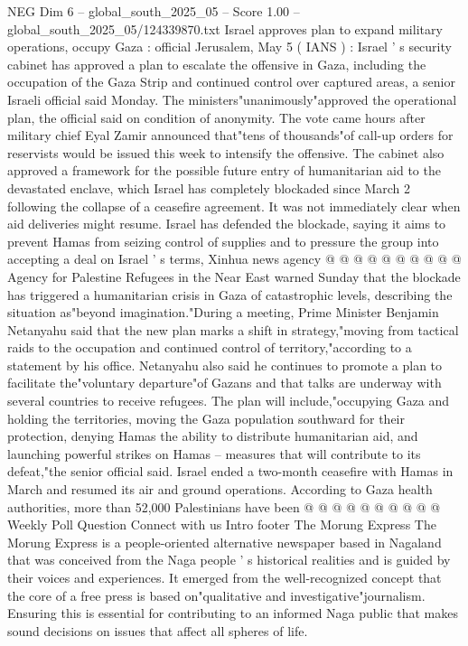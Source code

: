 \begin{textsample}{NEG Dim 6 – global\_south\_2025\_05 – Score 1.00 – global\_south\_2025\_05/124339870.txt}  \label{ex:f6_neg_423}
Israel approves plan to expand military operations, occupy Gaza : official Jerusalem, May 5 ( IANS ) : Israel ' s security cabinet has approved a plan to escalate the offensive in Gaza, including the occupation of the Gaza Strip and continued control over captured areas, a senior Israeli official said Monday.
The ministers"unanimously"approved the operational plan, the official said on condition of anonymity.
The vote came hours after military chief Eyal Zamir announced that"tens of thousands"of call-up orders for reservists would be issued this week to intensify the offensive.
The cabinet also approved a framework for the possible future entry of humanitarian aid to the devastated enclave, which Israel has completely blockaded since March 2 following the collapse of a ceasefire agreement.
It was not immediately clear when aid deliveries might resume.
Israel has defended the blockade, saying it aims to prevent Hamas from seizing control of supplies and to pressure the group into accepting a deal on Israel ' s terms, Xinhua news agency @ @ @ @ @ @ @ @ @ @ Agency for Palestine Refugees in the Near East warned Sunday that the blockade has triggered a humanitarian crisis in Gaza of catastrophic levels, describing the situation as"beyond imagination."During a meeting, Prime Minister Benjamin Netanyahu said that the new plan marks a shift in strategy,"moving from tactical raids to the occupation and continued control of territory,"according to a statement by his office.
Netanyahu also said he continues to promote a plan to facilitate the"voluntary departure"of Gazans and that talks are underway with several countries to receive refugees.
The plan will include,"occupying Gaza and holding the territories, moving the Gaza population southward for their protection, denying Hamas the ability to distribute humanitarian aid, and launching powerful strikes on Hamas -- measures that will contribute to its defeat,"the senior official said.
Israel ended a two-month ceasefire with Hamas in March and resumed its air and ground operations.
According to Gaza health authorities, more than 52,000 Palestinians have been @ @ @ @ @ @ @ @ @ @ Weekly Poll Question Connect with us Intro footer The Morung Express The Morung Express is a people-oriented alternative newspaper based in Nagaland that was conceived from the Naga people ' s historical realities and is guided by their voices and experiences.
It emerged from the well-recognized concept that the core of a free press is based on"qualitative and investigative"journalism.
Ensuring this is essential for contributing to an informed Naga public that makes sound decisions on issues that affect all spheres of life.

\end{textsample}
